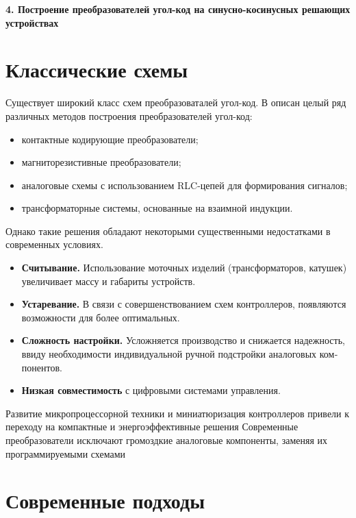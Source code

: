 \newpage

  \noindent\textbf{\large 4. Построение преобразователей угол-код на синусно-косинусных решающих устройствах}



\section{Классические схемы}

Существует широкий класс схем преобразоваталей угол-код.
В \cite{Vulvet} описан целый ряд различных методов построения преобразователей угол-код: 

\begin{itemize}
  \item контактные кодирующие преобразователи;
  \item магниторезистивные преобразователи;
  \item аналоговые схемы с использованием RLC-цепей для формирования сигналов;
  \item трансформаторные системы, основанные на взаимной индукции.
\end{itemize}

Однако такие решения обладают некоторыми существенными недостатками в современных условиях.
\begin{itemize}
  \item \textbf{Считывание.} Использование моточных изделий (трансформаторов, катушек) увеличивает массу и габариты устройств.
  \item \textbf{Устаревание.} В связи с совершенствованием схем контроллеров, появляются возможности для более оптимальных.
  \item \textbf{Сложность настройки.} Усложняется производство и снижается надежность, ввиду необходимости индивидуальной ручной подстройки аналоговых ком­
понентов.
  \item \textbf{Низкая совместимость} с цифровыми системами управления.
\end{itemize}

Развитие микропроцессорной техники и миниатюризация контроллеров привели к переходу на компактные и энергоэффективные решения
Современные преобразователи исключают громоздкие аналоговые компоненты, заменяя их программируемыми схемами


\section{Современные подходы}

